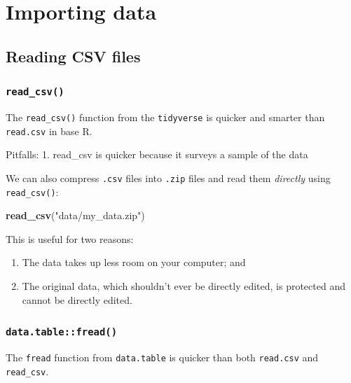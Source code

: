 \documentclass[]{book}
\newenvironment{Shaded}{\begin{snugshade}}{\end{snugshade}}
\newcommand{\KeywordTok}[1]{\textcolor[rgb]{0.13,0.29,0.53}{\textbf{#1}}}
\newcommand{\NormalTok}[1]{#1}
\newcommand{\StringTok}[1]{\textcolor[rgb]{0.31,0.60,0.02}{#1}}
\providecommand{\tightlist}{%
  \setlength{\itemsep}{0pt}\setlength{\parskip}{0pt}}
\begin{document}
\hypertarget{importing-data}{%
\section{Importing data}\label{importing-data}}

\hypertarget{reading-csv-files}{%
\subsection{Reading CSV files}\label{reading-csv-files}}

\hypertarget{read_csv}{%
\subsubsection{\texorpdfstring{\texttt{read\_csv()}}{read\_csv()}}\label{read_csv}}

The \texttt{read\_csv()} function from the \texttt{tidyverse} is quicker and smarter than \texttt{read.csv} in base R.

Pitfalls:
1. read\_csv is quicker because it surveys a sample of the data

We can also compress \texttt{.csv} files into \texttt{.zip} files and read them \emph{directly} using \texttt{read\_csv()}:

\begin{Shaded}
\begin{Highlighting}[]
\KeywordTok{read_csv}\NormalTok{(}\StringTok{"data/my_data.zip"}\NormalTok{)}
\end{Highlighting}
\end{Shaded}

This is useful for two reasons:

\begin{enumerate}
\def\labelenumi{\arabic{enumi}.}
\tightlist
\item
  The data takes up less room on your computer; and
\item
  The original data, which shouldn't ever be directly edited, is protected and cannot be directly edited.
\end{enumerate}

\hypertarget{data.tablefread}{%
\subsubsection{\texorpdfstring{\texttt{data.table::fread()}}{data.table::fread()}}\label{data.tablefread}}

The \texttt{fread} function from \texttt{data.table} is quicker than both \texttt{read.csv} and \texttt{read\_csv}.
\end{document}
